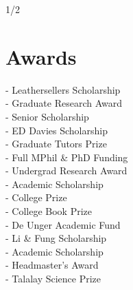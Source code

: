 \documentclass[a4paper]{custom-resume}
\begin{document}
\vfill
\begin{center}
1/2
\end{center}


\newpage

\vfill

\begin{minipage}[t][0.8\textheight]{0.33\textwidth}


\section{Awards}

\begin{flushleft}
    - Leathersellers Scholarship \\
                                            - Graduate Research Award \\
                                            - Senior Scholarship \\
                                            - ED Davies Scholarship \\
                                            - Graduate Tutors Prize \\ \vspace{4pt}
        - Full MPhil \& PhD Funding \\ \vspace{4pt}
                 - Undergrad Research Award \\ \vspace{4pt}
          - Academic Scholarship \\
                                            - College Prize \\
                                            - College Book Prize \\
                                            - De Unger Academic Fund \\ \vspace{4pt}
             - Li \& Fung Scholarship \\ \vspace{4pt}
                    - Academic Scholarship \\
                                            - Headmaster’s Award \\
                                            - Talalay Science Prize
\end{flushleft}


\end{minipage}
\end{document}
